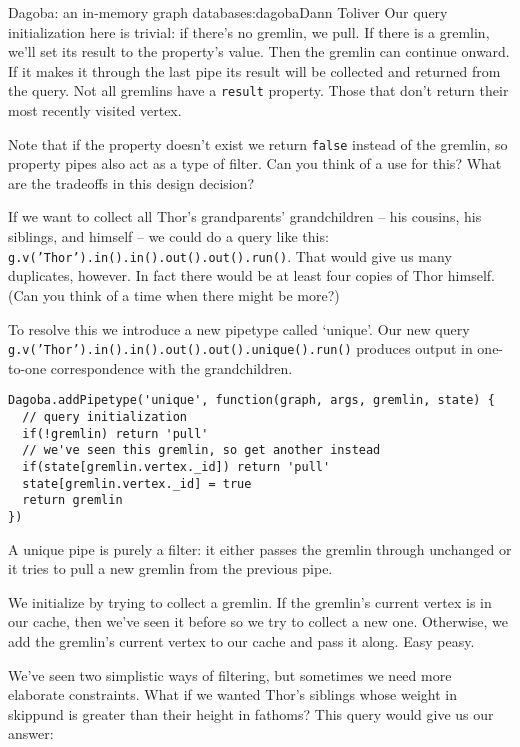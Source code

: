 \begin{aosachapter}{Dagoba: an in-memory graph database}{s:dagoba}{Dann Toliver}
Our query initialization here is trivial: if there's no gremlin, we
pull. If there is a gremlin, we'll set its result to the property's
value. Then the gremlin can continue onward. If it makes it through the
last pipe its result will be collected and returned from the query. Not
all gremlins have a \texttt{result} property. Those that don't return
their most recently visited vertex.

Note that if the property doesn't exist we return \texttt{false} instead
of the gremlin, so property pipes also act as a type of filter. Can you
think of a use for this? What are the tradeoffs in this design decision?

\label{unique}

If we want to collect all Thor's grandparents' grandchildren -- his
cousins, his siblings, and himself -- we could do a query like this:
\texttt{g.v('Thor').in().in().out().out().run()}. That would give us
many duplicates, however. In fact there would be at least four copies of
Thor himself. (Can you think of a time when there might be more?)

To resolve this we introduce a new pipetype called `unique'. Our new
query
\linebreak \texttt{g.v('Thor').in().in().out().out().unique().run()}
produces output in one-to-one correspondence with the grandchildren.

\begin{verbatim}
Dagoba.addPipetype('unique', function(graph, args, gremlin, state) {
  // query initialization
  if(!gremlin) return 'pull'                            
  // we've seen this gremlin, so get another instead
  if(state[gremlin.vertex._id]) return 'pull'
  state[gremlin.vertex._id] = true
  return gremlin
})
\end{verbatim}

A unique pipe is purely a filter: it either passes the gremlin through
unchanged or it tries to pull a new gremlin from the previous pipe.

We initialize by trying to collect a gremlin. If the gremlin's current
vertex is in our cache, then we've seen it before so we try to collect a
new one. Otherwise, we add the gremlin's current vertex to our cache and
pass it along. Easy peasy.

\label{filter}

We've seen two simplistic ways of filtering, but sometimes we need more
elaborate constraints. What if we wanted Thor's siblings whose weight in
skippund is greater than their height in fathoms? This query would give
us our answer:


\end{aosachapter}
